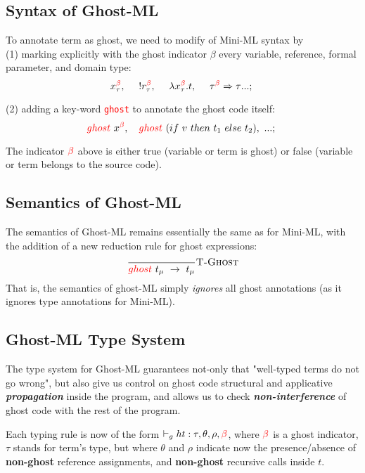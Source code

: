 \documentclass[a4paper,11pt,oneside]{article}
\theoremstyle{plain}
\newcommand{\rouge}[1]{\textcolor{red}{#1}}
\newcommand{\gb}{\beta}
\newcommand{\gbr}{\textcolor{red}{\gb}}
\begin{document}
\subsection{Syntax of Ghost-ML}
To annotate term as ghost,  we need to modify of Mini-ML syntax by\\

(1) marking explicitly with the ghost indicator $\beta$ every variable, reference,  formal parameter, and domain type: 
$$x_\tau^{\rouge{\beta}},~ \quad !r^{\rouge{\beta}}_{\tau},~ \quad \lambda x_\tau^{\rouge{\beta}}. t,~ \quad {\tau^{\rouge{\beta}} \Rightarrow \tau}...;~$$

(2) adding a key-word \texttt{\rouge{ghost}} to annotate the ghost code itself: 
$$\rouge{ghost}~x^{\rouge{\beta}},~~~\rouge{ghost}~(if~v~ then~ t_1~ else~ t_2),~ ...;~$$

The indicator $\gbr$ above is either true (variable or term is ghost) or false (variable or term belongs to the source code).

\subsection{Semantics of Ghost-ML}

The semantics of Ghost-ML remains essentially the same as for Mini-ML,
with the addition of a new reduction rule for ghost expressions:
$$\dfrac{}{\rouge{ghost}~ t_\mu~ \rightarrow~ t_\mu}{\textsc{T-Ghost}}$$
That is, the semantics of ghost-ML simply \textit{ignores} all ghost annotations (as it ignores type annotations for Mini-ML).

\subsection{Ghost-ML Type System}

The type system for Ghost-ML guarantees not-only that "well-typed terms do not go wrong", but also give us control on ghost code structural and applicative \textbf{\textit{propagation}} inside the program, and allows us to check  \textbf{\textit{non-interference}} of ghost code with the rest of the program.   

	Each typing rule is now of the form $\vdash_gh t : \tau,
        \theta, \rho, \rouge{\beta}$, where $\rouge{\beta}$ is a ghost indicator, $\tau$ stands for term's type, but where $\theta$ and $\rho$ indicate now the presence/absence of \textbf{non-ghost} reference assignments, and \textbf{non-ghost} recursive calls inside $t$.
\end{document}
